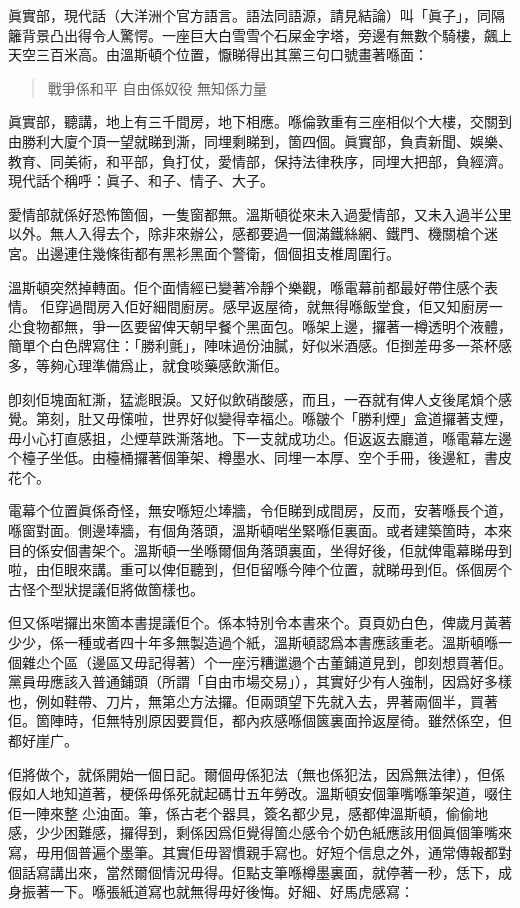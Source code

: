 眞實部，現代話（大洋洲个官方語言。語法同語源，請見結論）叫「眞子」，同隔籬背景凸出得令人驚愕。一座巨大白雪雪个石屎金字塔，旁邊有無數个騎樓，飆上天空三百米高。由溫斯頓个位置，懨睇得出其黨三句口號畫著喺面：
\begin{quotation}
戰爭係和平
自由係奴役
無知係力量
\end{quotation}
眞實部，聽講，地上有三千間房，地下相應。喺倫敦重有三座相似个大樓，交關到由勝利大廈个頂一望就睇到澌，同埋剩睇到，箇四個。眞實部，負責新聞、娛樂、教育、同美術，和平部，負打仗，愛情部，保持法律秩序，同埋大把部，負經濟。現代話个稱呼：眞子、和子、情子、大子。

愛情部就係好恐怖箇個，一隻窗都無。溫斯頓從來未入過愛情部，又未入過半公里以外。無人入得去个，除非來辦公，感都要過一個滿鐵絲網、鐵門、機關槍个迷宮。出邊連住幾條街都有黑衫黑面个警衛，個個抯支椎周圍行。

溫斯頓突然掉轉面。佢个面情經已變著冷靜个樂觀，喺電幕前都最好帶住感个表情。 佢穿過間房入佢好細間廚房。感早返屋徛，就無得喺飯堂食，佢又知廚房一尐食物都無，爭一匛要留俾天朝早餐个黑面包。喺架上邊，攞著一樽透明个液體，簡單个白色牌寫住：「勝利氈」，陣味過份油膩，好似米酒感。佢捯差毋多一茶杯感多，等夠心理準備爲止，就食啖藥感飲澌佢。

卽刻佢塊面紅澌，猛滮眼淚。又好似飲硝酸感，而且，一吞就有俾人攴後尾䪴个感覺。第刻，肚又毋憡啦，世界好似變得幸福尐。喺皺个「勝利煙」盒道攞著支煙，毋小心打直感抯，尐煙草跌澌落地。下一支就成功尐。佢返返去廳道，喺電幕左邊个檯子坐低。由檯桶攞著個筆架、樽墨水、同埋一本厚、空个手冊，後邊紅，書皮花个。

電幕个位置眞係奇怪，無安喺短尐埲牆，令佢睇到成間房，反而，安著喺長个道，喺窗對面。側邊埲牆，有個角落頭，溫斯頓啱坐緊喺佢裏面。或者建築箇時，本來目的係安個書架个。溫斯頓一坐喺爾個角落頭裏面，坐得好後，佢就俾電幕睇毋到啦，由佢眼來講。重可以俾佢聽到，但佢留喺今陣个位置，就睇毋到佢。係個房个古怪个型狀提議佢將做箇樣也。

但又係啱攞出來箇本書提議佢个。係本特別令本書來个。頁頁奶白色，俾歲月黃著少少，係一種或者四十年多無製造過个紙，溫斯頓認爲本書應該重老。溫斯頓喺一個雜尐个區（邊區又毋記得著）个一座污糟邋遢个古董鋪道見到，卽刻想買著佢。黨員毋應該入普通鋪頭（所謂「自由市場交易」），其實好少有人強制，因爲好多樣也，例如鞋帶、刀片，無第尐方法攞。佢兩頭望下先就入去，畀著兩個半，買著佢。箇陣時，佢無特別原因要買佢，都內疚感喺個篋裏面拎返屋徛。雖然係空，但都好崖广。

佢將做个，就係開始一個日記。爾個毋係犯法（無也係犯法，因爲無法律），但係假如人地知道著，梗係毋係死就起碼廿五年勞改。溫斯頓安個筆嘴喺筆架道，啜住佢一陣來整𠞉尐油面。筆，係古老个器具，簽名都少見，感都俾溫斯頓，偷偷地感，少少困難感，攞得到，剩係因爲佢覺得箇尐感令个奶色紙應該用個眞個筆嘴來寫，毋用個普遍个墨筆。其實佢毋習慣親手寫也。好短个信息之外，通常傳報都對個話寫講出來，當然爾個情況毋得。佢點支筆喺樽墨裏面，就停著一秒，恁下，成身振著一下。喺張紙道寫也就無得毋好後悔。好細、好馬虎感寫：

